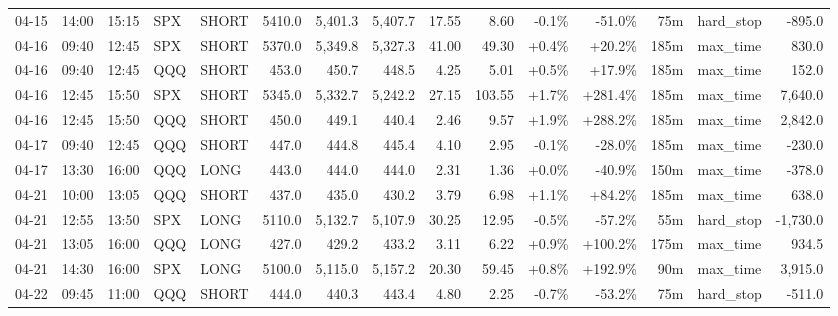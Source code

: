 \documentclass[11pt,a4paper,twoside]{article}
\begin{document}
\begin{landscape}
\begin{center}
\begin{longtable}{>{\color{txtmain}}l l l l l r r r r r r r r >{\color{txtmain}}l r}
04-15 & 14:00 & 15:15 & SPX & SHORT & 5410.0 & 5,401.3 & 5,407.7 & 17.55 & 8.60 & \textcolor{lossred}{-0.1\%} & \textcolor{lossred}{-51.0\%} & 75m & hard\_stop & \textcolor{lossred}{-895.0} \\
04-16 & 09:40 & 12:45 & SPX & SHORT & 5370.0 & 5,349.8 & 5,327.3 & 41.00 & 49.30 & \textcolor{wingreen}{+0.4\%} & \textcolor{wingreen}{+20.2\%} & 185m & max\_time & \textcolor{wingreen}{830.0} \\
04-16 & 09:40 & 12:45 & QQQ & SHORT & 453.0 & 450.7 & 448.5 & 4.25 & 5.01 & \textcolor{wingreen}{+0.5\%} & \textcolor{wingreen}{+17.9\%} & 185m & max\_time & \textcolor{wingreen}{152.0} \\
04-16 & 12:45 & 15:50 & SPX & SHORT & 5345.0 & 5,332.7 & 5,242.2 & 27.15 & 103.55 & \textcolor{wingreen}{+1.7\%} & \textcolor{wingreen}{+281.4\%} & 185m & max\_time & \textcolor{wingreen}{7,640.0} \\
04-16 & 12:45 & 15:50 & QQQ & SHORT & 450.0 & 449.1 & 440.4 & 2.46 & 9.57 & \textcolor{wingreen}{+1.9\%} & \textcolor{wingreen}{+288.2\%} & 185m & max\_time & \textcolor{wingreen}{2,842.0} \\
04-17 & 09:40 & 12:45 & QQQ & SHORT & 447.0 & 444.8 & 445.4 & 4.10 & 2.95 & \textcolor{lossred}{-0.1\%} & \textcolor{lossred}{-28.0\%} & 185m & max\_time & \textcolor{lossred}{-230.0} \\
04-17 & 13:30 & 16:00 & QQQ & LONG & 443.0 & 444.0 & 444.0 & 2.31 & 1.36 & \textcolor{wingreen}{+0.0\%} & \textcolor{lossred}{-40.9\%} & 150m & max\_time & \textcolor{lossred}{-378.0} \\
04-21 & 10:00 & 13:05 & QQQ & SHORT & 437.0 & 435.0 & 430.2 & 3.79 & 6.98 & \textcolor{wingreen}{+1.1\%} & \textcolor{wingreen}{+84.2\%} & 185m & max\_time & \textcolor{wingreen}{638.0} \\
04-21 & 12:55 & 13:50 & SPX & LONG & 5110.0 & 5,132.7 & 5,107.9 & 30.25 & 12.95 & \textcolor{lossred}{-0.5\%} & \textcolor{lossred}{-57.2\%} & 55m & hard\_stop & \textcolor{lossred}{-1,730.0} \\
04-21 & 13:05 & 16:00 & QQQ & LONG & 427.0 & 429.2 & 433.2 & 3.11 & 6.22 & \textcolor{wingreen}{+0.9\%} & \textcolor{wingreen}{+100.2\%} & 175m & max\_time & \textcolor{wingreen}{934.5} \\
04-21 & 14:30 & 16:00 & SPX & LONG & 5100.0 & 5,115.0 & 5,157.2 & 20.30 & 59.45 & \textcolor{wingreen}{+0.8\%} & \textcolor{wingreen}{+192.9\%} & 90m & max\_time & \textcolor{wingreen}{3,915.0} \\
04-22 & 09:45 & 11:00 & QQQ & SHORT & 444.0 & 440.3 & 443.4 & 4.80 & 2.25 & \textcolor{lossred}{-0.7\%} & \textcolor{lossred}{-53.2\%} & 75m & hard\_stop & \textcolor{lossred}{-511.0} \\

\end{longtable}
\end{center}
\end{landscape}
\end{document}
